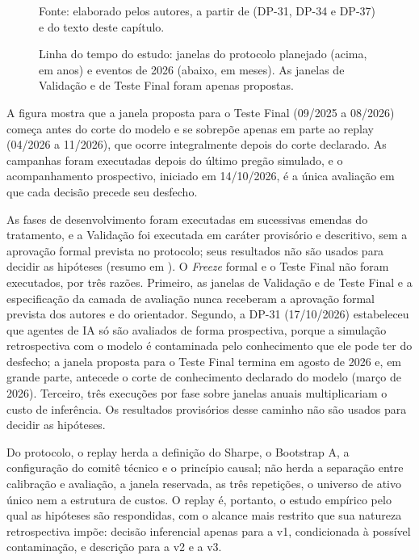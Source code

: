 \begin{figure}[htbp]
{%
}
\caption{Linha do tempo do estudo: janelas do protocolo planejado (acima, em anos) e eventos de 2026 (abaixo, em meses). As janelas de Validação e de Teste Final foram apenas propostas.}
\label{fig:met-linha-tempo}
{\footnotesize Fonte: elaborado pelos autores, a partir de  (\mbox{DP-31}, \mbox{DP-34} e \mbox{DP-37}) e do texto deste capítulo.}
\end{figure}

A figura mostra que a janela proposta para o Teste Final (09/2025 a 08/2026) começa antes do corte do modelo e se sobrepõe apenas em parte ao replay (04/2026 a 11/2026), que ocorre integralmente depois do corte declarado. As campanhas foram executadas depois do último pregão simulado, e o acompanhamento prospectivo, iniciado em 14/10/2026, é a única avaliação em que cada decisão precede seu desfecho.

As fases de desenvolvimento foram executadas em sucessivas emendas do tratamento, e a Validação foi executada em caráter provisório e descritivo, sem a aprovação formal prevista no protocolo; seus resultados não são usados para decidir as hipóteses (resumo em ). O \textit{Freeze} formal e o Teste Final não foram executados, por três razões. Primeiro, as janelas de Validação e de Teste Final e a especificação da camada de avaliação nunca receberam a aprovação formal prevista dos autores e do orientador. Segundo, a \mbox{DP-31} (17/10/2026) estabeleceu que agentes de IA só são avaliados de forma prospectiva, porque a simulação retrospectiva com o modelo é contaminada pelo conhecimento que ele pode ter do desfecho; a janela proposta para o Teste Final termina em agosto de 2026 e, em grande parte, antecede o corte de conhecimento declarado do modelo (março de 2026). Terceiro, três execuções por fase sobre janelas anuais multiplicariam o custo de inferência. Os resultados provisórios desse caminho não são usados para decidir as hipóteses.

Do protocolo, o replay herda a definição do Sharpe, o Bootstrap A, a configuração do comitê técnico e o princípio causal; não herda a separação entre calibração e avaliação, a janela reservada, as três repetições, o universo de ativo único nem a estrutura de custos. O replay é, portanto, o estudo empírico pelo qual as hipóteses são respondidas, com o alcance mais restrito que sua natureza retrospectiva impõe: decisão inferencial apenas para a v1, condicionada à possível contaminação, e descrição para a v2 e a v3.

